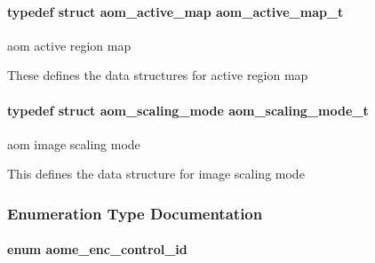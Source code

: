 \paragraph[{\texorpdfstring{aom\+\_\+active\+\_\+map\+\_\+t}{aom_active_map_t}}]{\setlength{\rightskip}{0pt plus 5cm}typedef struct {\bf aom\+\_\+active\+\_\+map}  {\bf aom\+\_\+active\+\_\+map\+\_\+t}}\hypertarget{group__aom__encoder_gaaba582f3bd806cb3a0a6b8a66c1041e5}{}\label{group__aom__encoder_gaaba582f3bd806cb3a0a6b8a66c1041e5}


aom active region map 

These defines the data structures for active region map 
\paragraph[{\texorpdfstring{aom\+\_\+scaling\+\_\+mode\+\_\+t}{aom_scaling_mode_t}}]{\setlength{\rightskip}{0pt plus 5cm}typedef struct {\bf aom\+\_\+scaling\+\_\+mode}  {\bf aom\+\_\+scaling\+\_\+mode\+\_\+t}}\hypertarget{group__aom__encoder_ga8d9d932b058ba7e762cd39d403dd4e68}{}\label{group__aom__encoder_ga8d9d932b058ba7e762cd39d403dd4e68}


aom image scaling mode 

This defines the data structure for image scaling mode 

\subsubsection{Enumeration Type Documentation}
\paragraph[{\texorpdfstring{aome\+\_\+enc\+\_\+control\+\_\+id}{aome_enc_control_id}}]{\setlength{\rightskip}{0pt plus 5cm}enum {\bf aome\+\_\+enc\+\_\+control\+\_\+id}}\hypertarget{group__aom__encoder_gae78dde67a6d78f332e9bdba0dde42db5}{}\label{group__aom__encoder_gae78dde67a6d78f332e9bdba0dde42db5}


